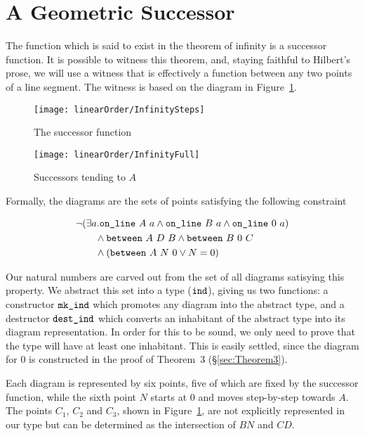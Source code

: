 \section{A Geometric Successor}
The function which is said to exist in the theorem of infinity is a successor function. It is possible to  witness this theorem, and, staying faithful to Hilbert's prose, we will use a witness that is effectively a function between any two points of a line segment. The witness is based on the diagram in Figure~\ref{fig:successor}.

\begin{figure}
\centering\texttt{[image: linearOrder/InfinitySteps]}
\caption{The successor function}
\label{fig:successor}
\end{figure}

\begin{figure}
\centering\texttt{[image: linearOrder/InfinityFull]}
\caption{Successors tending to $A$}
\label{fig:FullSuccessor}
\end{figure}

Formally, the diagrams are the sets of points satisfying the following constraint

\begin{align}
&\neg(\exists a.\texttt{on\_line}\ A\ a\wedge \texttt{on\_line}\ B\ a\wedge \texttt{on\_line}\ 0\ a) \label{theorem:IndConstraint}\\
&\qquad\wedge \texttt{between}\ A\ D\ B \wedge \texttt{between}\ B\ 0\ C\notag\\
&\qquad\wedge (\texttt{between}\ A\ N\ 0 \vee N = 0)\notag
\end{align}

Our natural numbers are carved out from the set of all diagrams satisying this property. We abstract this set into a type ($\texttt{ind}$), giving us two functions: a constructor $\texttt{mk\_ind}$ which promotes any diagram into the abstract type, and a destructor $\texttt{dest\_ind}$ which converts an inhabitant of the abstract type into its diagram representation. In order for this to be sound, we only need to prove that the type will have at least one inhabitant. This is easily settled, since the diagram for $0$ is constructed in the proof of Theorem~3 (\S\ref{sec:Theorem3}). 

Each diagram is represented by six points, five of which are fixed by the successor function, while the sixth point $N$ starts at $0$ and moves step-by-step towards $A$. The points $C_1$, $C_2$ and $C_3$, shown in Figure~\ref{fig:successor}, are not explicitly represented in our type but can be determined as the intersection of $BN$ and $CD$.

